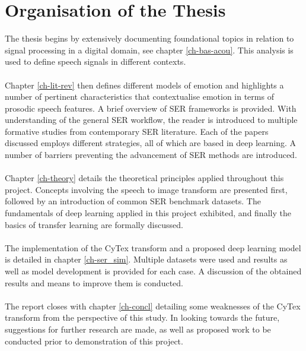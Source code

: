 \section{Organisation of the Thesis}
The thesis begins by extensively documenting foundational topics in relation to signal processing in a digital domain, see chapter \ref{ch-bas-acou}. This analysis is used to define speech signals in different contexts.\\ \\
Chapter \ref{ch-lit-rev} then defines different models of emotion and highlights a number of pertinent characteristics that contextualise emotion in terms of prosodic speech features. A brief overview of SER frameworks is provided. With understanding of the general SER workflow, the reader is introduced to multiple formative studies from contemporary SER literature. Each of the papers discussed employs different strategies, all of which are based in deep learning. A number of barriers preventing the advancement of SER methods are introduced.\\ \\
Chapter \ref{ch-theory} details the theoretical principles applied throughout this project. Concepts involving the speech to image transform are presented first, followed by an introduction of common SER benchmark datasets. The fundamentals of deep learning applied in this project exhibited, and finally the basics of transfer learning are formally discussed.\\ \\
The implementation of the CyTex transform and a proposed deep learning model is detailed in chapter \ref{ch-ser_sim}. Multiple datasets were used and results as well as model development is provided for each case. A discussion of the obtained results and means to improve them is conducted.\\ \\
The report closes with chapter \ref{ch-concl} detailing some weaknesses of the CyTex transform from the perspective of this study. In looking towards the future, suggestions for further research are made, as well as proposed work to be conducted prior to demonstration of this project.

